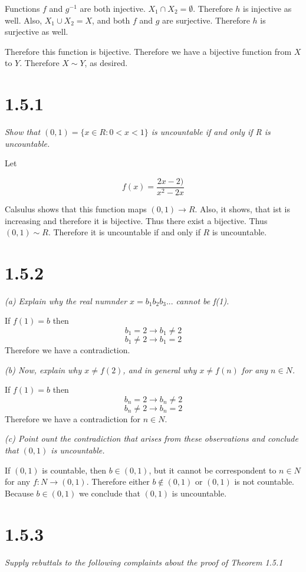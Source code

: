 \documentclass[11pt,oneside,titlepage]{book}
\begin{document}
Functions $f$ and $g^{-1}$ are both injective.  $X_1 \cap X_2 = \emptyset$. Therefore
$h$ is injective as well.
Also, $X_1 \cup X_2 = X$,  and both $f$ and $g$ are surjective. Therefore $h$ is surjective
as well.

Therefore this function is bijective. Therefore we have a bijective function from
$X$ to $Y$. Therefore $X \sim Y$, as desired.
    
\section*{1.5.1}
\textit{Show that $(0, 1) = \{x \in R: 0 < x < 1\}$ is uncountable if and only if R
  is uncountable.}

Let

$$ f(x) = \frac{2x - 2)}{x ^ 2 - 2x}$$

Calsulus shows that this function maps $(0, 1) \to R$. Also, it shows,
that ist is increasing and therefore it is bijective. Thus
there exist a bijective. Thus $(0, 1) \sim R$. Therefore it is uncountable
if and only if $R$ is uncountable.

\section*{1.5.2}
\textit{(a) Explain why the real numnder $x = b_1 b_2 b_3...$ cannot be f(1).}

If $f(1) = b$ then
$$b_1 = 2 \to b_1 \neq 2$$
$$b_1 \neq 2 \to b_1 = 2$$
Therefore we have a contradiction.

\textit{(b) Now, explain why $x \neq f(2)$, and in general why $x \neq f(n)$ for any
  $n \in N$. }

If $f(1) = b$ then
$$b_n = 2 \to b_n \neq 2$$
$$b_n \neq 2 \to b_n = 2$$
Therefore we have a contradiction for $n \in N$.

\textit{(c) Point ount the contradiction that arises from these observations and
  conclude that $(0, 1)$ is uncountable.}

If $(0,1)$ is countable, then $b \in (0, 1)$, but it cannot be correspondent
to $n \in N$ for any $f: N \to (0, 1)$. Therefore either $b \notin (0, 1)$ or
$(0, 1)$ is not countable. Because $b \in (0, 1)$ we conclude that $(0, 1)$ is
uncountable.

\section*{1.5.3}
\textit{Supply rebuttals to the following complaints about the proof of
  Theorem 1.5.1}
\end{document}
